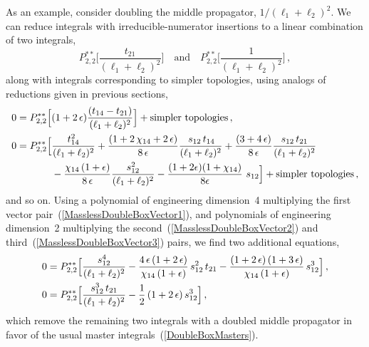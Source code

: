 \documentclass[aps,prd,preprint,groupedaddress,nofootinbib,showpacs,eqsecnum]{revtex4}
\def\eps{\epsilon}
\def\Pss#1#2{P^{**}_{#1,#2}}
\begin{document}
As an example, consider doubling the middle propagator, $1/(\ell_1+\ell_2)^2$.
We can reduce integrals with irreducible-numerator insertions to a linear
combination of two integrals,
\begin{equation}
\Pss22\bigl[\frac{t_{21}}{(\ell_1+\ell_2)^2}\bigr]\quad\textrm{and}\quad
\Pss22\bigl[\frac{1}{(\ell_1+\ell_2)^2}\bigr]\,,
\end{equation}
along with integrals corresponding to simpler topologies, using analogs
of reductions given in previous sections,
\begin{equation}
\begin{aligned}
0 = \Pss22\Bigl[&
(1+2\,\eps)\frac{(t_{14}-t_{21})}{(\ell_1+\ell_2)^{2}}
\Bigr] + \textrm{simpler\ topologies}\,,\\
%
0 = \Pss22\Bigl[&
\frac{t_{14}^{2}}{(\ell_1+\ell_2)^{2}}
+\frac{(1+2\,\chi_{14}+2\,\eps)}{8\,\eps}
\frac{\,s_{12}\,t_{14}}{(\ell_1+\ell_2)^{2}}
+\frac{(3+4\,\eps)}{8\,\eps}
\frac{s_{12}\,t_{21}}{(\ell_1+\ell_2)^{2}}
\\ &
-\frac{\chi_{14}\,(1+\eps)}{8\,\eps}
\frac{s_{12}^{2}}{(\ell_1+\ell_2)^{2}}
-\frac{(1+2\eps)(1+\chi_{14})}{8\eps}\,\,s_{12}
\Bigr] + \textrm{simpler\ topologies}\,,\\
\end{aligned}
\label{DoubledPropagatorIBP2}
\end{equation}  
and so on.
Using a polynomial of engineering
dimension~4 multiplying the first vector pair~(\ref{MasslessDoubleBoxVector1}), 
and polynomials of engineering dimension~2 multiplying the 
second~(\ref{MasslessDoubleBoxVector2}) and 
third~(\ref{MasslessDoubleBoxVector3}) pairs,
we find two additional equations,
\begin{equation}
\begin{aligned}
0 = \Pss22\Bigl[&
\frac{s_{12}^{4}}{(\ell_1+\ell_2)^2}
-\frac{4\,\eps\,(1+2\,\eps)}{\chi_{14}\,(1+\eps)}\,s_{12}^{2}\,t_{21}
-\frac{(1+2\,\eps)\,(1+3\,\eps)}{\chi_{14}\,(1+\eps)}\,s_{12}^{3}
\Bigr]\,,\\
0 = \Pss22\Bigl[&
\frac{s_{12}^{3}\,t_{21}}{(\ell_1+\ell_2)^2}
-\frac{1}{2}\,(1+2\,\eps)\,s_{12}^{3}
\Bigr]\,,\\
\end{aligned}
\label{DoubledPropagatorIBP3}
\end{equation}
which remove the remaining two integrals with a doubled middle propagator
in favor of the usual master integrals~(\ref{DoubleBoxMasters}).
\end{document}
